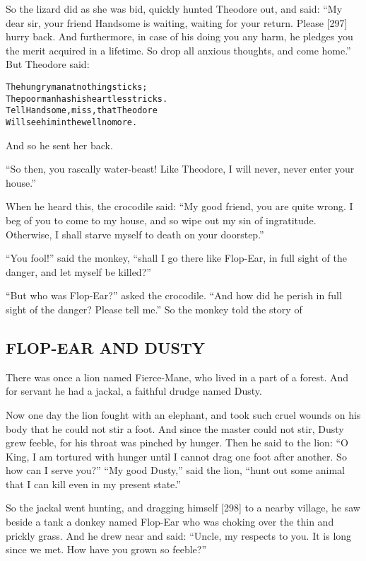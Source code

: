 \documentclass{article}
\renewenvironment{verbatim}{\begin{alltt}\normalfont\begin{centering}}{\end{centering}\end{alltt}}
\begin{document}
So the lizard did as she was bid, quickly hunted Theodore out, and
said:
``My dear sir, your friend Handsome is waiting, waiting for your return. Please [297] hurry back. And furthermore, in case of his doing you any harm, he pledges you the merit acquired in a lifetime. So drop all anxious thoughts, and come home.''
But Theodore said:

\begin{verbatim}
The hungry man at nothing sticks;
The poor man has his heartless tricks.
Tell Handsome, miss, that Theodore
Will see him in the well no more.
\end{verbatim}
And so he sent her back.

``So then, you rascally water-beast! Like Theodore, I will never, never enter your house.''

When he heard this, the crocodile said:
``My good friend, you are quite wrong. I beg of you to come to my house, and so wipe out my sin of ingratitude. Otherwise, I shall starve myself to death on your doorstep.''

``You fool!'' said the monkey,
``shall I go there like Flop-Ear, in full sight of the danger, and let myself be killed?''

``But who was Flop-Ear?'' asked the crocodile.
``And how did he perish in full sight of the danger? Please tell me.''
So the monkey told the story of

\subsection{FLOP-EAR AND DUSTY}

There was once a lion named Fierce-Mane, who lived in a part of a
forest. And for servant he had a jackal, a faithful drudge named
Dusty.

Now one day the lion fought with an elephant, and took such cruel
wounds on his body that he could not stir a foot. And since the
master could not stir, Dusty grew feeble, for his throat was
pinched by hunger. Then he said to the lion:
``O King, I am tortured with hunger until I cannot drag one foot after another. So how can I serve you?''
``My good Dusty,'' said the lion,
``hunt out some animal that I can kill even in my present state.''

So the jackal went hunting, and dragging himself [298] to a nearby
village, he saw beside a tank a donkey named Flop-Ear who was
choking over the thin and prickly grass. And he drew near and said:
``Uncle, my respects to you. It is long since we met. How have you grown so feeble?''
\end{document}
